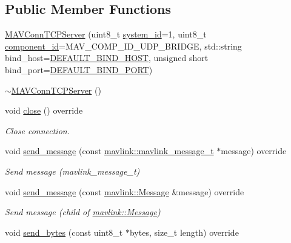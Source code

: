 \subsection*{Public Member Functions}
\begin{DoxyCompactItemize}
\item 
\mbox{\hyperlink{group__mavconn_gad395465c3a85e4441cbccc84615cacb5}{M\+A\+V\+Conn\+T\+C\+P\+Server}} (uint8\+\_\+t \mbox{\hyperlink{setHome_8cpp_a83150acb88d810ae6864b4c125324ed6}{system\+\_\+id}}=1, uint8\+\_\+t \mbox{\hyperlink{setHome_8cpp_adc84285d5da2c4fa9721d0a32d5e41a7}{component\+\_\+id}}=M\+A\+V\+\_\+\+C\+O\+M\+P\+\_\+\+I\+D\+\_\+\+U\+D\+P\+\_\+\+B\+R\+I\+D\+GE, std\+::string bind\+\_\+host=\mbox{\hyperlink{group__mavconn_gae043843ee4b947094ca58342c442c3b6}{D\+E\+F\+A\+U\+L\+T\+\_\+\+B\+I\+N\+D\+\_\+\+H\+O\+ST}}, unsigned short bind\+\_\+port=\mbox{\hyperlink{group__mavconn_gacf9d47d0f198105f4a27c9668ba793b1}{D\+E\+F\+A\+U\+L\+T\+\_\+\+B\+I\+N\+D\+\_\+\+P\+O\+RT}})
\item 
\mbox{\hyperlink{group__mavconn_gaee25f07913d08d976e205be3136d813c}{$\sim$\+M\+A\+V\+Conn\+T\+C\+P\+Server}} ()
\item 
void \mbox{\hyperlink{group__mavconn_ga11e23cc16d8a8637583fbecc7bbe915b}{close}} () override
\begin{DoxyCompactList}\small\item\em Close connection. \end{DoxyCompactList}\item 
void \mbox{\hyperlink{group__mavconn_gacbae4efba2ed887e4a731ca60dceb0a6}{send\+\_\+message}} (const \mbox{\hyperlink{include__v0_89_2mavlink__types_8h_a63b963764c09dc72f4910c1521e325b9}{mavlink\+::mavlink\+\_\+message\+\_\+t}} $\ast$message) override
\begin{DoxyCompactList}\small\item\em Send message (mavlink\+\_\+message\+\_\+t) \end{DoxyCompactList}\item 
void \mbox{\hyperlink{group__mavconn_ga8e3d7a81031fe54f3326f2ea4ccfa2ef}{send\+\_\+message}} (const \mbox{\hyperlink{structmavlink_1_1Message}{mavlink\+::\+Message}} \&message) override
\begin{DoxyCompactList}\small\item\em Send message (child of \mbox{\hyperlink{structmavlink_1_1Message}{mavlink\+::\+Message}}) \end{DoxyCompactList}\item 
void \mbox{\hyperlink{group__mavconn_ga4eedf8da39d9dee8cf84074d010ddf0d}{send\+\_\+bytes}} (const uint8\+\_\+t $\ast$bytes, size\+\_\+t length) override

\end{DoxyCompactItemize}
